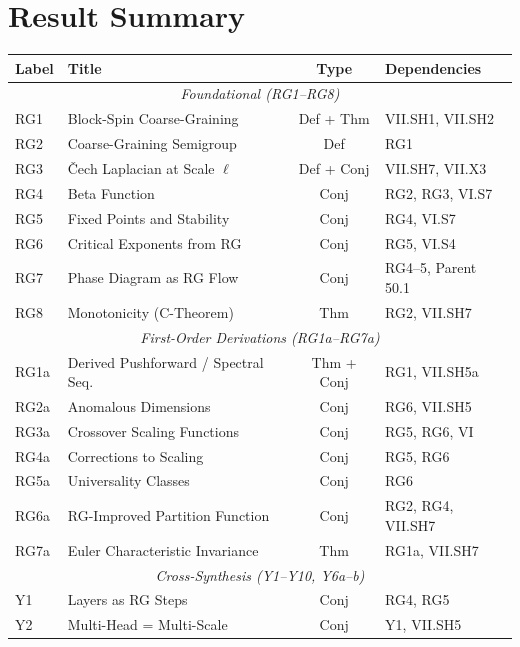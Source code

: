 \documentclass[11pt,letterpaper]{article}
\begin{document}
\newpage
\section{Result Summary}\label{app:results}

\begin{center}
\renewcommand{\arraystretch}{1.3}
\begin{tabular}{llcl}
\textbf{Label} & \textbf{Title} & \textbf{Type} 
& \textbf{Dependencies} \\
\hline
\multicolumn{4}{c}{\emph{Foundational (RG1--RG8)}} \\
\hline
RG1 & Block-Spin Coarse-Graining & Def + Thm 
& VII.SH1, VII.SH2 \\
RG2 & Coarse-Graining Semigroup & Def 
& RG1 \\
RG3 & \v{C}ech Laplacian at Scale $\ell$ & Def + Conj 
& VII.SH7, VII.X3 \\
RG4 & Beta Function & Conj 
& RG2, RG3, VI.S7 \\
RG5 & Fixed Points and Stability & Conj 
& RG4, VI.S7 \\
RG6 & Critical Exponents from RG & Conj 
& RG5, VI.S4 \\
RG7 & Phase Diagram as RG Flow & Conj 
& RG4--5, Parent 50.1 \\
RG8 & Monotonicity (C-Theorem) & Thm 
& RG2, VII.SH7 \\
\hline
\multicolumn{4}{c}{\emph{First-Order Derivations 
(RG1a--RG7a)}} \\
\hline
RG1a & Derived Pushforward / Spectral Seq.\ & Thm + Conj 
& RG1, VII.SH5a \\
RG2a & Anomalous Dimensions & Conj 
& RG6, VII.SH5 \\
RG3a & Crossover Scaling Functions & Conj 
& RG5, RG6, VI \\
RG4a & Corrections to Scaling & Conj 
& RG5, RG6 \\
RG5a & Universality Classes & Conj 
& RG6 \\
RG6a & RG-Improved Partition Function & Conj 
& RG2, RG4, VII.SH7 \\
RG7a & Euler Characteristic Invariance & Thm 
& RG1a, VII.SH7 \\
\hline
\multicolumn{4}{c}{\emph{Cross-Synthesis (Y1--Y10, Y6a--b)}} \\
\hline
Y1 & Layers as RG Steps & Conj 
& RG4, RG5 \\
Y2 & Multi-Head = Multi-Scale & Conj 
& Y1, VII.SH5 \\

\end{tabular}
\end{center}
\end{document}
